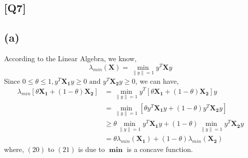 \documentclass[12pt, a4 paper]{article}
\begin{document}
    \begin{framed}
        \section{[Q7]}
        \subsection{(a)}
        According to the Linear Algebra, we know,
        $$
        \lambda_{min}(\boldsymbol{X}) = \min \limits_{\lVert y \rVert = 1} y^T \boldsymbol{X} y 
        $$
        \indent Since $0 \leq \theta \leq 1, y^T\boldsymbol{X_1}y \geq 0 \text{ and } y^T
        \boldsymbol{X_2}y \geq 0$, we can have,
        \begin{align}
            \lambda_{min} \left[ \theta \boldsymbol{X_1} + (1-\theta) \boldsymbol{X_2} \right]
            &=  \min \limits_{\lVert y \rVert = 1} y^T \left[ \theta \boldsymbol{X_1} + (1-\theta) 
            \boldsymbol{X_2} \right] y \\
            &= \min \limits_{\lVert y \rVert = 1} \left[ \theta y^T \boldsymbol{X_1} y + 
            (1-\theta) y^T \boldsymbol{X_2} y \right]\\
            &\geq \theta \min \limits_{\lVert y \rVert = 1} y^T \boldsymbol{X_1} y + (1-\theta)
            \min \limits_{\lVert y \rVert = 1} y^T \boldsymbol{X_2} y \\
            &= \theta \lambda_{min} (\boldsymbol{X_1}) + (1-\theta) \lambda_{min} (\boldsymbol{X_2})
        \end{align}
        \indent where, $(20)$ to $(21)$ is due to $\boldsymbol{\min}$ is a concave function.


\end{framed}
\end{document}
